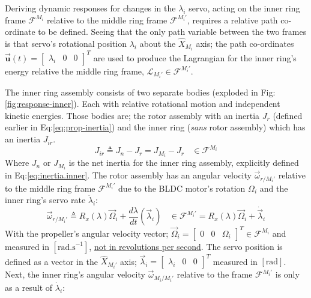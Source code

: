 \par
Deriving dynamic responses for changes in the $\lambda_i$ servo, acting on the inner ring frame $\mathcal{F}^{M_i}$ relative to the middle ring frame $\mathcal{F}^{M_i'}$, requires a relative path co-ordinate to be defined. Seeing that the only path variable between the two frames is that servo's rotational position $\lambda_i$ about the $\hat{X}_{M_i}$ axis; the path co-ordinates $\vec{\mathbf{u}}(t)=\begin{bmatrix}\lambda_i&0&0\end{bmatrix}^T$ are used to produce the Lagrangian for the inner ring's energy relative the middle ring frame, $\mathcal{L}_{M_i'}\in\mathcal{F}^{M_i'}$.
\par
The inner ring assembly consists of two separate bodies (exploded in Fig:\ref{fig:response-inner}). Each with relative rotational motion and independent kinetic energies. Those bodies are; the rotor assembly with an inertia $J_{r}$ (defined earlier in Eq:\ref{eq:prop-inertia}) and the inner ring (\emph{sans} rotor assembly) which has an inertia $J_{ir}$.
\begin{equation}
J_{ir}\triangleq J_{n}-J_{r}=J_{M_i}-J_{r}~~~~\in\mathcal{F}^{M_i}
\end{equation} 
Where $J_n$ or $J_{M_i}$ is the net inertia for the inner ring assembly, explicitly defined in Eq:\ref{eq:inertia.inner}. The rotor assembly has an angular velocity $\vec{\omega}_{r/M_i'}$ relative to the middle ring frame $\mathcal{F}^{M_i'}$ due to the BLDC motor's rotation $\Omega_i$ and the inner ring's servo rate $\dot{\lambda}_i$:
\begin{subequations}\label{eq:angular-rot}
\begin{equation}
\vec{\omega}_{r/M_i'}\triangleq R_x(\lambda)\vec{\Omega}_i+\frac{d\lambda}{dt}(\vec{\lambda}_i)~~~~\in\mathcal{F}^{M_i'}
\end{equation}
\begin{equation}
=R_x(\lambda)\vec{\Omega}_i+\dot{\vec{\lambda}}_i
\end{equation}
\end{subequations}
With the propeller's angular velocity vector; $\vec{\Omega}_i=\begin{bmatrix}0 & 0 & \Omega_i\end{bmatrix}^T\in\mathcal{F}^{M_i}$ and measured in $[\text{rad.s}^{-1}]$, \underline{not in revolutions per second}. The servo position is defined as a vector in the $\hat{X}_{M_i'}$ axis; $\vec{\lambda}_i=\begin{bmatrix}\lambda_i & 0 & 0\end{bmatrix}^T$ measured in $[\text{rad}]$. Next, the inner ring's angular velocity $\vec{\omega}_{M_i/M_i'}$ relative to the frame $\mathcal{F}^{M_i'}$ is only as a result of $\dot{\lambda}_i$:
